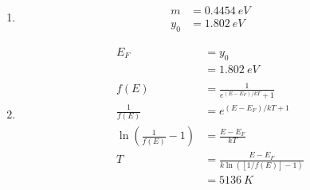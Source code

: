 \documentclass{article}
\begin{document}
\begin{enumerate}
  \item

        \begin{align*}
          m   & = \qty{0.4454}{eV} \\
          y_0 & = \qty{1.802}{eV}
        \end{align*}

  \item

        \begin{align*}
          E_F                                   & = y_0                                    \\
                                                & = \qty{1.802}{eV}                        \\ \\
          f(E)                                  & = \frac{1}{e^{(E - E_F) / k T} + 1}      \\
          \frac{1}{f(E)}                        & = e^{(E - E_F) / k T + 1}                \\
          \ln \left( \frac{1}{f(E)} - 1 \right) & = \frac{E - E_F}{k T}                    \\
          T                                     & = \frac{E - E_F}{k \ln ([1 / f(E)] - 1)} \\
                                                & = \qty{5136}{K}
        \end{align*}
\end{enumerate}

\setcounter{subsubsection}{52}
\subsubsection{}
\end{document}
